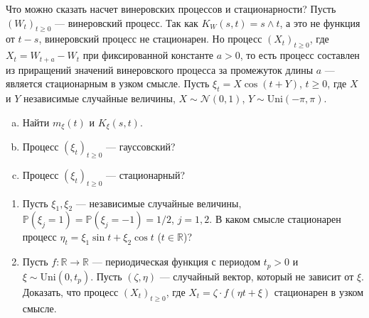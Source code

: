 \documentclass[10pt]{article}
\theoremstyle{boldnormal}
\newcommand{\R}{{\ensuremath{\mathbb{R}}}}
\newcommand{\PP}{{\ensuremath{\mathbb{P}}}}
\theoremstyle{boldremark}
\newenvironment{example}
  {\pushQED{\qed}\renewcommand{\qedsymbol}{$\triangle$}\examplex}
  {\popQED\endexamplex}
\newenvironment{zadachsem}
  {\pushQED{\qed}\renewcommand{\qedsymbol}{$\triangleleft$}\zadachsemm}
  {\popQED\endzadachsemm}
\begin{document}
Что можно сказать насчет винеровских процессов и стационарности?
\begin{example}
 Пусть $(W_t)_{t \geq 0}$ --- винеровский процесс. 
Так как \(K_W(s,t)=s\wedge t\), а это не функция от \(t-s\),
винеровский процесс не стационарен.
Но процесс \((X_t)_{t\geq 0}\), где
$X_t = W_{t+a} - W_t$ при фиксированной константе $a > 0$,
то есть процесс составлен из приращений значений винеровского процесса
за промежуток длины $a$ --- является стационарным в узком смысле.
\end{example}
\begin{zadachsem}
Пусть \(\xi_t = X\cos(t+Y)\), \(t\geq 0\), где \(X\) и \(Y\) независимые случайные
величины, \(X\sim \mathcal{N}(0,1)\), \(Y\sim \textrm{Uni}(-\pi,\pi)\).
\begin{enumerate}[(a)]
    \item Найти \(m_{\xi}(t)\) и \(K_{\xi}(s,t)\).
    \item Процесс \((\xi_t)_{t\geq 0}\) --- гауссовский?
    \item Процесс \((\xi_t)_{t\geq 0}\) --- стационарный?
\end{enumerate}
\end{zadachsem}

\begin{zadachsem}

\begin{enumerate}
    \item Пусть \(\xi_1,\xi_2\) --- независимые случайные величины, 
    \(\PP(\xi_j=1)=\PP(\xi_j=-1)=1/2\), \(j=1,2\). 
    В каком смысле стационарен процесс \(\eta_t = \xi_1 \sin t + 
    \xi_2 \cos t\) (\(t\in \R\))?
    \item Пусть \(f:\R\to \R\) --- периодическая функция
    с периодом \(t_p >0\) и \(\xi\sim\textrm{Uni}(0,t_p)\).
    Пусть \((\zeta,\eta)\) --- случайный вектор, который не зависит от
    \(\xi\). Доказать, что процесс \((X_t)_{t\geq 0}\), где 
    \(X_t = \zeta \cdot f(\eta t +\xi)\) стационарен в узком смысле. 
\end{enumerate}
\end{zadachsem}




\printbibliography
\end{document}
